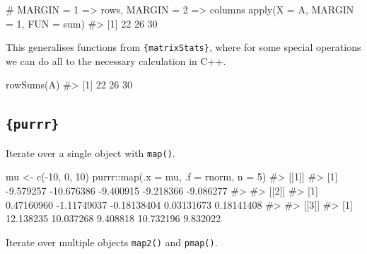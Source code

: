 \documentclass[
  letterpaper,
  DIV=11,
  numbers=noendperiod]{scrreprt}
\newenvironment{Shaded}{\begin{snugshade}}{\end{snugshade}}
\newcommand{\AttributeTok}[1]{\textcolor[rgb]{0.40,0.45,0.13}{#1}}
\newcommand{\CommentTok}[1]{\textcolor[rgb]{0.37,0.37,0.37}{#1}}
\newcommand{\DecValTok}[1]{\textcolor[rgb]{0.68,0.00,0.00}{#1}}
\newcommand{\FunctionTok}[1]{\textcolor[rgb]{0.28,0.35,0.67}{#1}}
\newcommand{\NormalTok}[1]{\textcolor[rgb]{0.00,0.23,0.31}{#1}}
\newcommand{\OtherTok}[1]{\textcolor[rgb]{0.00,0.23,0.31}{#1}}
\newcommand{\SpecialCharTok}[1]{\textcolor[rgb]{0.37,0.37,0.37}{#1}}
\begin{document}
\begin{Shaded}
\begin{Highlighting}[]
\CommentTok{\# MARGIN = 1 =\textgreater{} rows,  MARGIN = 2 =\textgreater{} columns}
\FunctionTok{apply}\NormalTok{(}\AttributeTok{X =}\NormalTok{ A, }\AttributeTok{MARGIN =} \DecValTok{1}\NormalTok{, }\AttributeTok{FUN =}\NormalTok{ sum)}
\CommentTok{\#\textgreater{} [1] 22 26 30}
\end{Highlighting}
\end{Shaded}

This generalises functions from \texttt{\{matrixStats\}}, where for some
special operations we can do all to the necessary calculation in C++.

\begin{Shaded}
\begin{Highlighting}[]
\FunctionTok{rowSums}\NormalTok{(A)}
\CommentTok{\#\textgreater{} [1] 22 26 30}
\end{Highlighting}
\end{Shaded}

\subsection{\texorpdfstring{\texttt{\{purrr\}}}{\{purrr\}}}\label{purrr}

Iterate over a single object with \texttt{map()}.

\begin{Shaded}
\begin{Highlighting}[]
\NormalTok{mu }\OtherTok{\textless{}{-}} \FunctionTok{c}\NormalTok{(}\SpecialCharTok{{-}}\DecValTok{10}\NormalTok{, }\DecValTok{0}\NormalTok{, }\DecValTok{10}\NormalTok{)}
\NormalTok{purrr}\SpecialCharTok{::}\FunctionTok{map}\NormalTok{(}\AttributeTok{.x =}\NormalTok{ mu, }\AttributeTok{.f =}\NormalTok{ rnorm, }\AttributeTok{n =} \DecValTok{5}\NormalTok{)}
\CommentTok{\#\textgreater{} [[1]]}
\CommentTok{\#\textgreater{} [1]  {-}9.579257 {-}10.676386  {-}9.400915  {-}9.218366  {-}9.086277}
\CommentTok{\#\textgreater{} }
\CommentTok{\#\textgreater{} [[2]]}
\CommentTok{\#\textgreater{} [1]  0.47160960 {-}1.11749037 {-}0.18138404  0.03131673  0.18141408}
\CommentTok{\#\textgreater{} }
\CommentTok{\#\textgreater{} [[3]]}
\CommentTok{\#\textgreater{} [1] 12.138235 10.037268  9.408818 10.732196  9.832022}
\end{Highlighting}
\end{Shaded}

Iterate over multiple objects \texttt{map2()} and \texttt{pmap()}.
\end{document}
